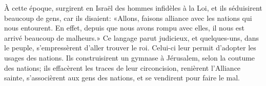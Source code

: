 À cette époque, surgirent en Israël des hommes infidèles à la Loi,
	et ils séduisirent beaucoup de gens, car ils disaient:
	«Allons, faisons alliance avec les nations qui nous entourent.
En effet, depuis que nous avons rompu avec elles,
	il nous est arrivé beaucoup de malheurs.»
Ce langage parut judicieux,
	et quelques-uns, dans le peuple, s’empressèrent d’aller trouver le roi.
	Celui-ci leur permit d’adopter les usages des nations.
Ils construisirent un gymnase à Jérusalem, selon la coutume des nations;
	ils effacèrent les traces de leur circoncision, renièrent l’Alliance sainte,
	s’associèrent aux gens des nations, et se vendirent pour faire le mal.
